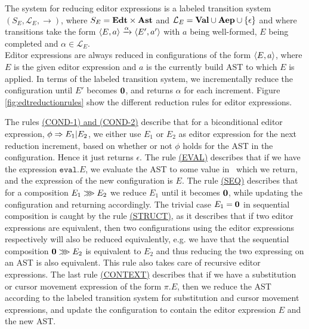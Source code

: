 The system for reducing editor expressions is a labeled transition system
$(S_E, \mathcal{L}_E, \to)$, where $S_E = \textbf{Edt} \times \textbf{Ast}$ and $\mathcal{L}_E
= \textbf{Val} \cup \textbf{Aep} \cup \{\epsilon\}$ and where transitions take the form
$\langle E, a \rangle \xrightarrow[]{\text{$\alpha$}} \langle E', a' \rangle$ with $a$ being
well-formed, $E$ being completed and $\alpha \in \mathcal{L}_E$. \\

Editor expressions are always reduced in configurations of the form
$\langle E,a \rangle$, where $E$ is the given editor expression and $a$ is the
currently build AST to which $E$ is applied. In terms of the labeled
transition system, we incrementally reduce the configuration until $E'$ becomes
$\mathbf{0}$, and returns $\alpha$ for each increment. Figure
\ref{fig:edtreductionrules} show the different reduction rules for editor
expressions.

The rules \hyperref[fig:edtreductionrules]{(COND-1) and (COND-2)} describe that
for a biconditional editor expression, $\phi \Rightarrow E_1|E_2$, we either use
$E_1$ or $E_2$ as editor expression for the next reduction increment, based on
whether or not $\phi$ holds for the AST in the configuration. Hence it just
returns $\epsilon$. The rule \hyperref[fig:edtreductionrules]{(EVAL)} describes
that if we have the expression $\texttt{eval}.E$, we evaluate the AST to some
value in \val~which we return, and the expression of the new configuration is
$E$. The rule \hyperref[fig:edtreductionrules]{(SEQ)} describes that for a
composition $E_1 \ggg E_2$ we reduce $E_1$ until it becomes $\mathbf{0}$, while
updating the configuration and returning accordingly. The trivial case $E_1 =
\mathbf{0}$ in sequential composition is caught by the rule
\hyperref[fig:edtreductionrules]{(STRUCT)}, as it describes that if two editor
expressions are equivalent, then two configurations using the editor expressions
respectively will also be reduced equivalently, e.g. we have that the sequential
composition $\mathbf{0} \ggg E_2$ is equivalent to $E_2$ and thus reducing the
two expressing on an AST is also equivalent. This rule also takes care of
recursive editor expressions. The last rule
\hyperref[fig:edtreductionrules]{(CONTEXT)} describes that if we have a
substitution or cursor movement expression of the form $\pi.E$, then we reduce
the AST according to the labeled transition system for substitution and cursor
movement expressions, and update the configuration to contain the editor
expression $E$ and the new AST. \\

